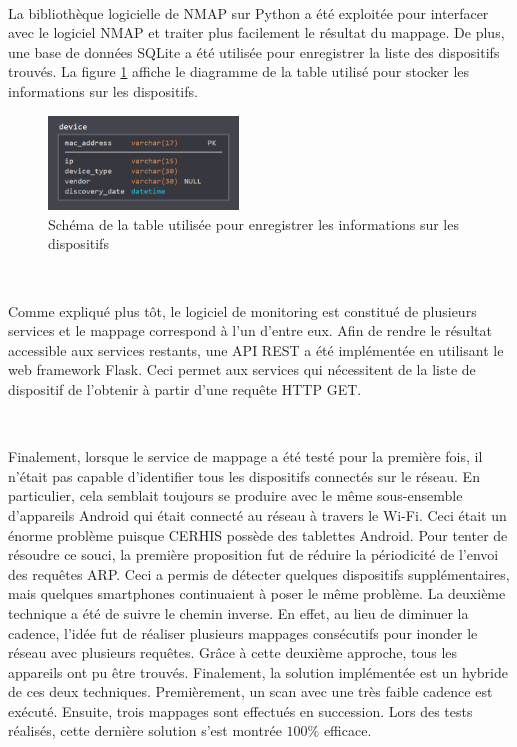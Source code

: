 ~

\noindent
La bibliothèque logicielle de NMAP sur Python a été exploitée pour interfacer avec le logiciel NMAP et traiter plus facilement le résultat du mappage. De plus, une base de données SQLite a été utilisée pour enregistrer la liste des dispositifs trouvés. La figure \ref{fig:db_device} affiche le diagramme de la table utilisé pour stocker les informations sur les dispositifs.

\begin{figure}[ht!]
  \centering
  \includegraphics[width=0.45\textwidth]{img/app/device_db.png}
  \caption{Schéma de la table utilisée pour enregistrer les informations sur les dispositifs}
  \label{fig:db_device}
\end{figure}

~

\noindent
Comme expliqué plus tôt, le logiciel de monitoring est constitué de plusieurs services et le mappage correspond à l'un d'entre eux. Afin de rendre le résultat accessible aux services restants, une API REST a été implémentée en utilisant le web framework Flask. Ceci permet aux services qui nécessitent de la liste de dispositif de l'obtenir à partir d'une requête HTTP GET.

~

\noindent
Finalement, lorsque le service de mappage a été testé pour la première fois, il n'était pas capable d'identifier tous les dispositifs connectés sur le réseau. En particulier, cela semblait toujours se produire avec le même sous-ensemble d'appareils Android qui était connecté au réseau à travers le Wi-Fi. Ceci était un énorme problème puisque CERHIS possède des tablettes Android. Pour tenter de résoudre ce souci, la première proposition fut de réduire la périodicité de l'envoi des requêtes ARP. Ceci a permis de détecter quelques dispositifs supplémentaires, mais quelques smartphones continuaient à poser le même problème. La deuxième technique a été de suivre le chemin inverse. En effet, au lieu de diminuer la cadence, l'idée fut de réaliser plusieurs mappages consécutifs pour inonder le réseau avec plusieurs requêtes. Grâce à cette deuxième approche, tous les appareils ont pu être trouvés. Finalement, la solution implémentée est un hybride de ces deux techniques. Premièrement, un scan avec une très faible cadence est exécuté. Ensuite, trois mappages sont effectués en succession. Lors des tests réalisés, cette dernière solution s'est montrée $100\%$ efficace.

